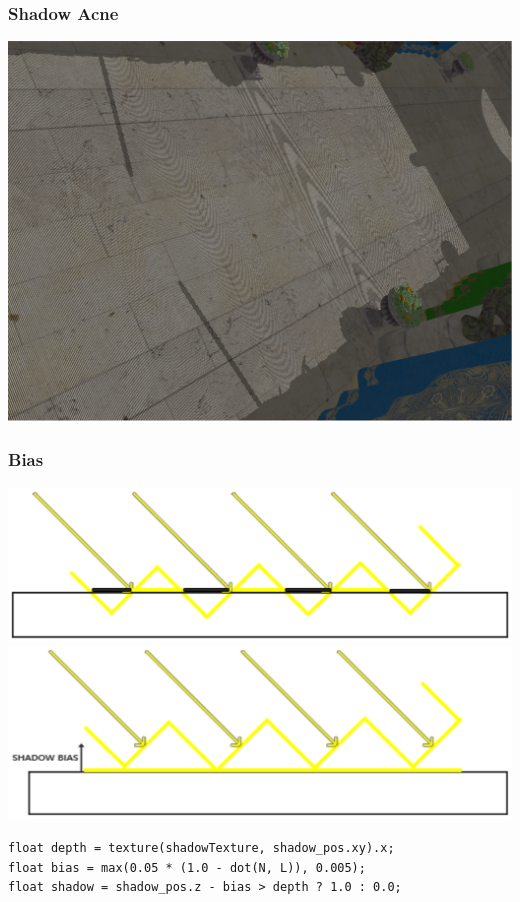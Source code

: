 \begin{frame}
    \frametitle{Shadow Acne}
    \includegraphics[width=\textwidth]{pics/shadows/shadowMapping/acne.eps}
\end{frame}

\begin{frame}[fragile]
    \frametitle{Bias}
    \includegraphics[width=.5\textwidth]{pics/shadows/shadowMapping/acne_before.eps}
    \includegraphics[width=.5\textwidth]{pics/shadows/shadowMapping/acne_after.eps}
    \vfill

{\small
  \begin{verbatim}
float depth = texture(shadowTexture, shadow_pos.xy).x;
float bias = max(0.05 * (1.0 - dot(N, L)), 0.005);
float shadow = shadow_pos.z - bias > depth ? 1.0 : 0.0; 
  \end{verbatim}
}
\end{frame}

